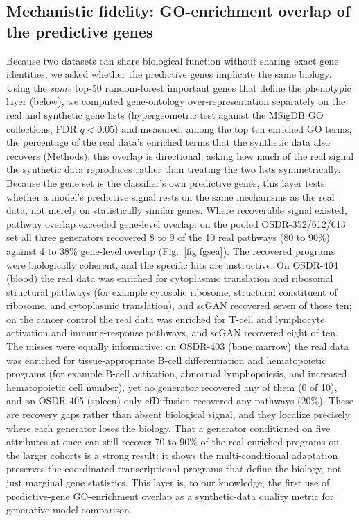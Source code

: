 \documentclass[11pt]{article}
\begin{document}
\subsection{Mechanistic fidelity: GO-enrichment overlap of the predictive genes}
Because two datasets can share biological function without sharing exact gene identities, we asked whether the predictive genes implicate the same biology. Using the \emph{same} top-50 random-forest important genes that define the phenotypic layer (below), we computed gene-ontology over-representation separately on the real and synthetic gene lists (hypergeometric test against the MSigDB GO collections, FDR $q<0.05$) and measured, among the top ten enriched GO terms, the percentage of the real data's enriched terms that the synthetic data also recovers (Methods); this overlap is directional, asking how much of the real signal the synthetic data reproduces rather than treating the two lists symmetrically. Because the gene set is the classifier's own predictive genes, this layer tests whether a model's predictive signal rests on the same mechanisms as the real data, not merely on statistically similar genes. Where recoverable signal existed, pathway overlap exceeded gene-level overlap: on the pooled OSDR-352/612/613 set all three generators recovered 8 to 9 of the 10 real pathways (80 to 90\%) against 4 to 38\% gene-level overlap (Fig.~\ref{fig:fgsea}). The recovered programs were biologically coherent, and the specific hits are instructive. On OSDR-404 (blood) the real data was enriched for cytoplasmic translation and ribosomal structural pathways (for example cytosolic ribosome, structural constituent of ribosome, and cytoplasmic translation), and scGAN recovered seven of those ten; on the cancer control the real data was enriched for T-cell and lymphocyte activation and immune-response pathways, and scGAN recovered eight of ten. The misses were equally informative: on OSDR-403 (bone marrow) the real data was enriched for tissue-appropriate B-cell differentiation and hematopoietic programs (for example B-cell activation, abnormal lymphopoiesis, and increased hematopoietic cell number), yet no generator recovered any of them (0 of 10), and on OSDR-405 (spleen) only cfDiffusion recovered any pathways (20\%). These are recovery gaps rather than absent biological signal, and they localize precisely where each generator loses the biology. That a generator conditioned on five attributes at once can still recover 70 to 90\% of the real enriched programs on the larger cohorts is a strong result: it shows the multi-conditional adaptation preserves the coordinated transcriptional programs that define the biology, not just marginal gene statistics. This layer is, to our knowledge, the first use of predictive-gene GO-enrichment overlap as a synthetic-data quality metric for generative-model comparison.
\end{document}
